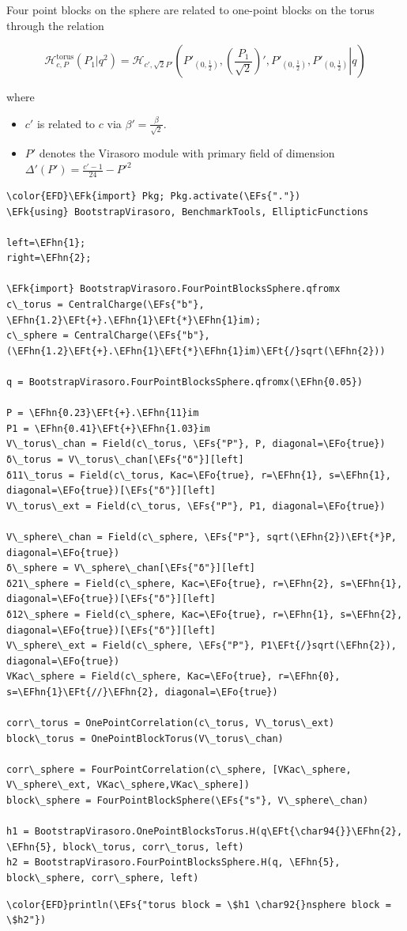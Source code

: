 \documentclass[a4paper]{article}
\numberwithin{equation}{section}
\newcommand{\EFs}[1]{\textcolor{EFs}{#1}} %
\newcommand{\EFk}[1]{\textcolor{EFk}{#1}} %
\newcommand{\EFt}[1]{\textcolor{EFt}{#1}} %
\newcommand{\EFo}[1]{\textcolor{EFo}{#1}} %
\newcommand{\EFhn}[1]{\textcolor{EFhn}{#1}} %
\begin{document}
Four point blocks on the sphere are related to one-point blocks on the torus through the relation

\[
\mathcal H^{\text{torus}}_{c, P}(P_{1} | q^{2}) = \mathcal H_{c', \sqrt{2}P'}\left(\left. P'_{(0,\frac12)}, \left(\frac{P_{1}}{\sqrt{2}}\right)', P'_{(0,\frac12)}, P'_{(0,\frac12)} \right| q \right)
\]

where
\begin{itemize}
\item \(c'\) is related to \(c\) via \(\beta'=\frac\beta{\sqrt 2}\).
\item \(P'\) denotes the Virasoro module with primary field of dimension \(\Delta'(P') = \frac{c'-1}{24} - P'^{2}\)
\end{itemize}

\begin{Code}
\begin{Verbatim}
\color{EFD}\EFk{import} Pkg; Pkg.activate(\EFs{"."})
\EFk{using} BootstrapVirasoro, BenchmarkTools, EllipticFunctions

left=\EFhn{1};
right=\EFhn{2};

\EFk{import} BootstrapVirasoro.FourPointBlocksSphere.qfromx
c\_torus = CentralCharge(\EFs{"b"}, \EFhn{1.2}\EFt{+}.\EFhn{1}\EFt{*}\EFhn{1}im);
c\_sphere = CentralCharge(\EFs{"b"}, (\EFhn{1.2}\EFt{+}.\EFhn{1}\EFt{*}\EFhn{1}im)\EFt{/}sqrt(\EFhn{2}))

q = BootstrapVirasoro.FourPointBlocksSphere.qfromx(\EFhn{0.05})

P = \EFhn{0.23}\EFt{+}.\EFhn{11}im
P1 = \EFhn{0.41}\EFt{+}\EFhn{1.03}im
V\_torus\_chan = Field(c\_torus, \EFs{"P"}, P, diagonal=\EFo{true})
δ\_torus = V\_torus\_chan[\EFs{"δ"}][left]
δ11\_torus = Field(c\_torus, Kac=\EFo{true}, r=\EFhn{1}, s=\EFhn{1}, diagonal=\EFo{true})[\EFs{"δ"}][left]
V\_torus\_ext = Field(c\_torus, \EFs{"P"}, P1, diagonal=\EFo{true})

V\_sphere\_chan = Field(c\_sphere, \EFs{"P"}, sqrt(\EFhn{2})\EFt{*}P, diagonal=\EFo{true})
δ\_sphere = V\_sphere\_chan[\EFs{"δ"}][left]
δ21\_sphere = Field(c\_sphere, Kac=\EFo{true}, r=\EFhn{2}, s=\EFhn{1}, diagonal=\EFo{true})[\EFs{"δ"}][left]
δ12\_sphere = Field(c\_sphere, Kac=\EFo{true}, r=\EFhn{1}, s=\EFhn{2}, diagonal=\EFo{true})[\EFs{"δ"}][left]
V\_sphere\_ext = Field(c\_sphere, \EFs{"P"}, P1\EFt{/}sqrt(\EFhn{2}), diagonal=\EFo{true})
VKac\_sphere = Field(c\_sphere, Kac=\EFo{true}, r=\EFhn{0}, s=\EFhn{1}\EFt{//}\EFhn{2}, diagonal=\EFo{true})

corr\_torus = OnePointCorrelation(c\_torus, V\_torus\_ext)
block\_torus = OnePointBlockTorus(V\_torus\_chan)

corr\_sphere = FourPointCorrelation(c\_sphere, [VKac\_sphere, V\_sphere\_ext, VKac\_sphere,VKac\_sphere])
block\_sphere = FourPointBlockSphere(\EFs{"s"}, V\_sphere\_chan)

h1 = BootstrapVirasoro.OnePointBlocksTorus.H(q\EFt{\char94{}}\EFhn{2}, \EFhn{5}, block\_torus, corr\_torus, left)
h2 = BootstrapVirasoro.FourPointBlocksSphere.H(q, \EFhn{5}, block\_sphere, corr\_sphere, left)
\end{Verbatim}
\end{Code}

\begin{Code}
\begin{Verbatim}
\color{EFD}println(\EFs{"torus block = \$h1 \char92{}nsphere block = \$h2"})
\end{Verbatim}
\end{Code}
\end{document}
